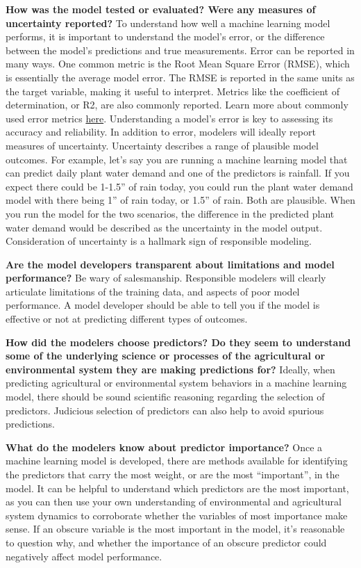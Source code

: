 \documentclass[
]{book}
\begin{document}
\textbf{How was the model tested or evaluated? Were any measures of uncertainty reported?}
To understand how well a machine learning model performs, it is important to understand the model's error, or the difference between the model's predictions and true measurements. Error can be reported in many ways. One common metric is the Root Mean Square Error (RMSE), which is essentially the average model error. The RMSE is reported in the same units as the target variable, making it useful to interpret. Metrics like the coefficient of determination, or R2, are also commonly reported. Learn more about commonly used error metrics \href{https://medium.com/@brandon93.w/regression-model-evaluation-metrics-r-squared-adjusted-r-squared-mse-rmse-and-mae-24dcc0e4cbd3}{here}. Understanding a model's error is key to assessing its accuracy and reliability. In addition to error, modelers will ideally report measures of uncertainty. Uncertainty describes a range of plausible model outcomes. For example, let's say you are running a machine learning model that can predict daily plant water demand and one of the predictors is rainfall. If you expect there could be 1-1.5'' of rain today, you could run the plant water demand model with there being 1'' of rain today, or 1.5'' of rain. Both are plausible. When you run the model for the two scenarios, the difference in the predicted plant water demand would be described as the uncertainty in the model output. Consideration of uncertainty is a hallmark sign of responsible modeling.

\textbf{Are the model developers transparent about limitations and model performance?}
Be wary of salesmanship. Responsible modelers will clearly articulate limitations of the training data, and aspects of poor model performance. A model developer should be able to tell you if the model is effective or not at predicting different types of outcomes.

\textbf{How did the modelers choose predictors? Do they seem to understand some of the underlying science or processes of the agricultural or environmental system they are making predictions for?}
Ideally, when predicting agricultural or environmental system behaviors in a machine learning model, there should be sound scientific reasoning regarding the selection of predictors. Judicious selection of predictors can also help to avoid spurious predictions.

\textbf{What do the modelers know about predictor importance?}
Once a machine learning model is developed, there are methods available for identifying the predictors that carry the most weight, or are the most ``important'', in the model. It can be helpful to understand which predictors are the most important, as you can then use your own understanding of environmental and agricultural system dynamics to corroborate whether the variables of most importance make sense. If an obscure variable is the most important in the model, it's reasonable to question why, and whether the importance of an obscure predictor could negatively affect model performance.
\end{document}
